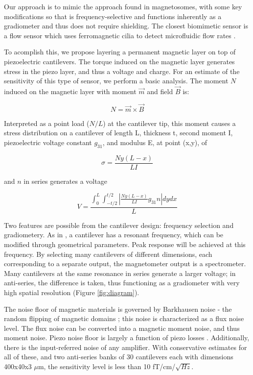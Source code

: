 Our approach is to mimic the approach found in magnetosomes, with some key modifications so that is frequency-selective and functions inherently as a gradiometer and thus does not require shielding. The closest biomimetic sensor is a flow sensor which uses ferromagnetic cilia to detect microfluidic flow rates \cite{alfadhel2014magnetic}.

To acomplish this, we propose layering a permanent magnetic layer on top of piezoelectric cantilevers. The torque induced on the magnetic layer generates stress in the piezo layer, and thus a voltage and charge. For an estimate of the sensitivity of this type of sensor, we perform a basic analysis. The moment $N$ induced on the magnetic layer with moment $\vec{m}$ and field $\vec{B}$ is:

$$  N=\vec{m} \times \vec{B} $$

Interpreted as a point load ($N/L$) at the cantilever tip, this moment causes a stress distribution on a cantilever of length L, thickness t, second moment I, piezoelectric voltage constant $g_{31}$, and modulus E, at point (x,y), of

$$ \sigma=\frac{Ny(L-x)}{LI} $$

and $n$ in series generates a voltage

$$ V=\frac{\int_0^L\int_{-t/2}^{t/2}\left|\frac{Ny(L-x)}{LI}g_{31}n\right|dydx}{L} $$

Two features are possible from the cantilever design: frequency selection and gradiometery. As in \cite{shen2008design}, a cantilever has a resonant frequency, which can be modified through geometrical parameters. Peak response will be achieved at this frequency. By selecting many cantilevers of different dimensions, each corresponding to a separate output, the magnetometer output is a spectrometer. Many cantilevers at the same resonance in series generate a larger voltage; in anti-series, the difference is taken, thus functioning as a gradiometer with very high spatial resolution (Figure \ref{fig:diagram}).

The noise floor of magnetic materials is governed by Barkhausen noise - the random flipping of magnetic domains \cite{butta2012sources}; this noise is characterized as a flux noise level. The flux noise can be converted into a magnetic moment noise, and thus moment noise. Piezo noise floor is largely a function of piezo losses \cite{levinzon2004fundamental}. Additionally, there is the input-referred noise of any amplifier. With conservative estimates for all of these, and two anti-series banks of 30 cantilevers each with dimensions 400x40x3 $\mu$m, the sensitivity level is less than 10 fT/cm/$\sqrt{Hz}$.

